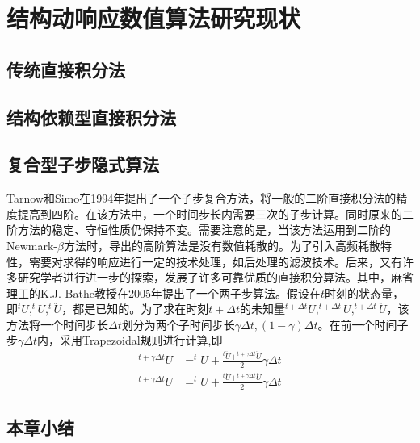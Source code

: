 \chapter{结构动响应数值算法研究现状}


\section{传统直接积分法}



\section{结构依赖型直接积分法}



\section{复合型子步隐式算法}
Tarnow和Simo在1994年提出了一个子步复合方法，将一般的二阶直接积分法的精度提高到四阶。在该方法中，一个时间步长内需要三次的子步计算。同时原来的二阶方法的稳定、守恒性质仍保持不变。需要注意的是，当该方法运用到二阶的Newmark-$\beta$方法\cite{Newmark1959}时，导出的高阶算法是没有数值耗散的。为了引入高频耗散特性，需要对求得的响应进行一定的技术处理，如后处理的滤波技术\cite{Fung1998}。后来，又有许多研究学者进行进一步的探索，发展了许多可靠优质的直接积分算法。其中，麻省理工的K.J. Bathe教授在2005年提出了一个两子步算法\cite{Bathe2005,Bathe2007,Bathe2012a}。假设在$t$时刻的状态量，即$^{t}U,^{t}\dot{U},^{t}\ddot{U}$，都是已知的。为了求在时刻$t+\Delta t$的未知量$^{t+\Delta t}U,^{t+\Delta t}\dot{U},^{t+\Delta t}\ddot{U}$，该方法将一个时间步长$\Delta t$划分为两个子时间步长$\gamma\Delta t,(1-\gamma)\Delta t$。在前一个时间子步$\gamma\Delta t$内，采用Trapezoidal规则\cite{book:dover}进行计算,即
\begin{align}
^{t+\gamma\Delta t}\dot{U}&=^{t}\dot{U}+\frac{^t\ddot{U}+^{t+\gamma\Delta t}\ddot{U}}{2}\gamma\Delta t\\
^{t+\gamma\Delta t}{U}&=^{t}U+\frac{^t\dot{U}+^{t+\gamma\Delta t}\dot{U}}{2}\gamma\Delta t
\end{align}




\section{本章小结}

